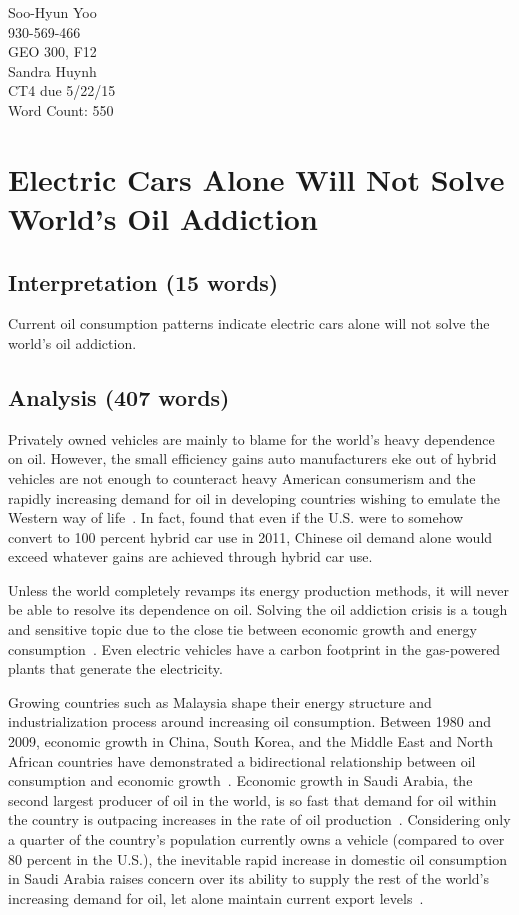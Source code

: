 \documentclass[12pt,letterpaper]{article}
\begin{document}
Soo-Hyun Yoo \\
930-569-466 \\
GEO 300, F12 \\
Sandra Huynh \\
CT4 due 5/22/15 \\
Word Count: 550

\section*{Electric Cars Alone Will Not Solve World's Oil Addiction}

\subsection*{Interpretation (15 words)}   %

Current oil consumption patterns indicate electric cars alone will not solve
the world's oil addiction.

\subsection*{Analysis (407 words)}   %

Privately owned vehicles are mainly to blame for the world's heavy dependence
on oil. However, the small efficiency gains auto manufacturers eke out of
hybrid vehicles are not enough to counteract heavy American consumerism and the
rapidly increasing demand for oil in developing countries wishing to emulate
the Western way of life~\citep[p. 310]{yetiv2011}. In fact, \citet[p.
289]{yetiv2011} found that even if the U.S. were to somehow convert to 100
percent hybrid car use in 2011, Chinese oil demand alone would exceed whatever
gains are achieved through hybrid car use.

Unless the world completely revamps its energy production methods, it will
never be able to resolve its dependence on oil. Solving the oil addiction
crisis is a tough and sensitive topic due to the close tie between economic
growth and energy consumption~\citep[p. 1355]{halkos2011}. Even electric
vehicles have a carbon footprint in the gas-powered plants that generate the
electricity.

Growing countries such as Malaysia shape their energy structure and
industrialization process around increasing oil consumption. Between 1980 and
2009, economic growth in China, South Korea, and the Middle East and North
African countries have demonstrated a bidirectional relationship between oil
consumption and economic growth~\citep[p. 220]{park2014}. Economic growth in
Saudi Arabia, the second largest producer of oil in the world, is so fast that
demand for oil within the country is outpacing increases in the rate of oil
production~\citep[p. 60]{gately2012}. Considering only a quarter of the
country's population currently owns a vehicle (compared to over 80 percent in
the U.S.), the inevitable rapid increase in domestic oil consumption in Saudi
Arabia raises concern over its ability to supply the rest of the world's
increasing demand for oil, let alone maintain current export levels~\citep[p.
65]{gately2012}.
\end{document}
